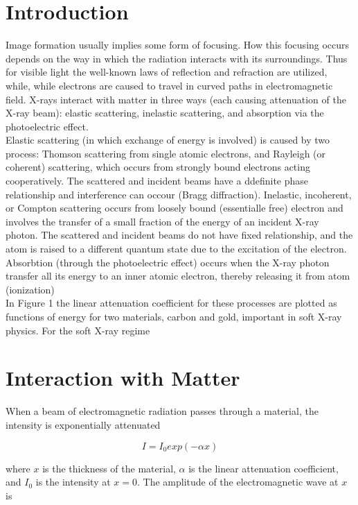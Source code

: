 \section{Introduction}
Image formation usually implies some form of focusing. How this focusing occurs depends on the way in which the radiation interacts with its surroundings. Thus for visible light the well-known laws of reflection and refraction are utilized, while, while electrons are caused to travel in curved paths in electromagnetic field. X-rays interact with matter in three ways (each causing attenuation of the X-ray beam): elastic scattering, inelastic scattering, and absorption via the photoelectric effect.
\\
Elastic scattering (in which exchange of energy is involved) is caused by two process: Thomson scattering from single atomic electrons, and Rayleigh (or coherent) scattering, which occurs from strongly bound electrons acting cooperatively. The scattered and incident beams have a ddefinite phase relationship and interference can occour (Bragg diffraction). Inelastic, incoherent, or Compton scattering occurs from loosely bound (essentialle free) electron and involves the transfer of a small fraction of the energy of an incident X-ray photon. The scattered and incident beams do not have fixed relationship, and the atom is raised to a different quantum state due to the excitation of the electron. Absorbtion (through the photoelectric effect) occurs when the X-ray photon transfer all its energy to an inner atomic electron, thereby releasing it from atom (ionization)
\\
In Figure 1 the linear attenuation coefficient for these processes are plotted as functions of energy for two materials, carbon and gold, important in soft X-ray physics. For the soft X-ray regime

\section{Interaction with Matter}
When a beam of electromagnetic radiation passes through a material, the intensity is exponentially attenuated

\begin{equation}
I = I_0 exp(-\alpha x)
\label{eq: intensity}
\end{equation}

\begin{flushleft}
where $x $ is the thickness of the material, $\alpha$ is the linear attenuation coefficient, and $I_0$ is the intensity at $x=0$. The amplitude of the electromagnetic wave at $x$ is
\end{flushleft}

